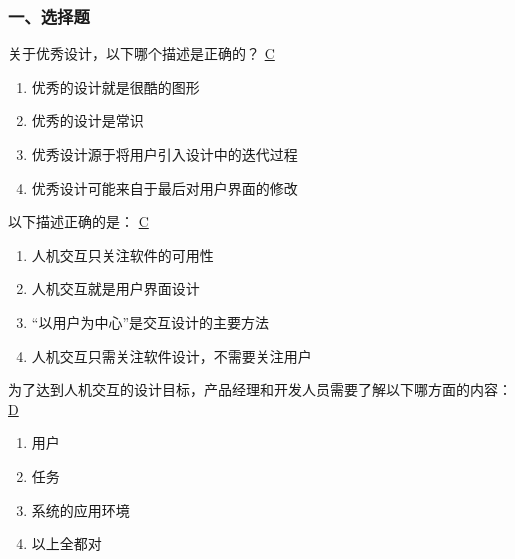 \subsubsection*{一、选择题}
\setcounter{problemname}{0}

\begin{problem}
	关于优秀设计，以下哪个描述是正确的？
	\uline{C}    
    \vspace{-0.8em}
    \begin{multicols}{2}
        \begin{enumerate}[label=\Alph*.]
            \item 优秀的设计就是很酷的图形
            \item 优秀的设计是常识
            \item 优秀设计源于将用户引入设计中的迭代过程
            \item 优秀设计可能来自于最后对用户界面的修改
        \end{enumerate}
    \end{multicols}
    \vspace{-1em}
\end{problem}



\begin{problem}
	以下描述正确的是：
	\uline{C}    
    \vspace{-0.8em}
    \begin{multicols}{2}
        \begin{enumerate}[label=\Alph*.]
            \item 人机交互只关注软件的可用性
            \item 人机交互就是用户界面设计
            \item “以用户为中心”是交互设计的主要方法
            \item 人机交互只需关注软件设计，不需要关注用户
        \end{enumerate}
    \end{multicols}
    \vspace{-1em}
\end{problem}



\begin{problem}
	为了达到人机交互的设计目标，产品经理和开发人员需要了解以下哪方面的内容：
	\uline{D}    
    \vspace{-0.8em}
    \begin{multicols}{4}
        \begin{enumerate}[label=\Alph*.]
            \item 用户
            \item 任务
            \item 系统的应用环境
            \item 以上全都对
        \end{enumerate}
    \end{multicols}
    \vspace{-1em}
\end{problem}



